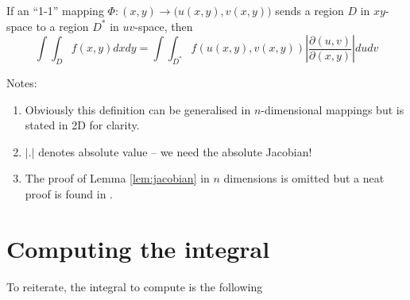 \documentclass[a4paper]{article}
\begin{document}
\begin{lemma}
	\label{lem:jacobian}
	If an ``1-1'' mapping $\Phi: (x,y)\rightarrow \big(u(x,y), v(x,y)\big)$ sends a region $D$ in $xy$-space to a region $D^*$ in $uv$-space, then
	\begin{equation}
		\int\int_Df(x,y)dxdy = \int\int_{D^*}f(u(x,y), v(x,y))\left| \frac{\partial(u,v)}{\partial(x,y)}  \right| dudv
	\end{equation}
\end{lemma}
Notes:
\begin{enumerate}
	\item Obviously this definition can be generalised in $n$-dimensional mappings but is stated in 2D for clarity.
	\item $\left| . \right|$ denotes absolute value -- we need the absolute Jacobian!
	\item The proof of Lemma \ref{lem:jacobian} in $n$ dimensions is omitted but a neat proof is found in .
\end{enumerate}


\section{Computing the integral}
To reiterate, the integral to compute is the following
\end{document}
